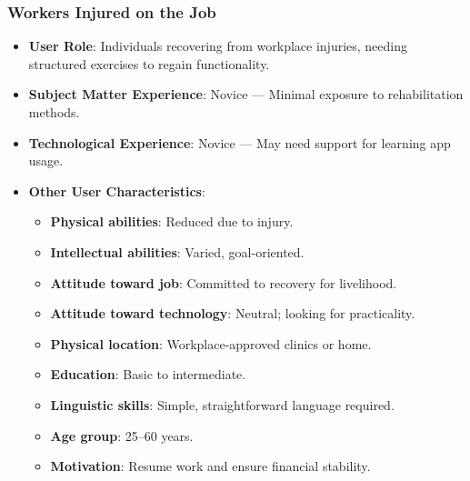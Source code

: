     \subsubsection{Workers Injured on the Job}
        \begin{itemize}
            \item \textbf{User Role}: Individuals recovering from workplace injuries, needing structured exercises to regain functionality.
            \item \textbf{Subject Matter Experience}: Novice --- Minimal exposure to rehabilitation methods.
            \item \textbf{Technological Experience}: Novice --- May need support for learning app usage.
            \item \textbf{Other User Characteristics}:
            \begin{itemize}
                \item \textbf{Physical abilities}: Reduced due to injury.
                \item \textbf{Intellectual abilities}: Varied, goal-oriented.
                \item \textbf{Attitude toward job}: Committed to recovery for livelihood.
                \item \textbf{Attitude toward technology}: Neutral; looking for practicality.
                \item \textbf{Physical location}: Workplace-approved clinics or home.
                \item \textbf{Education}: Basic to intermediate.
                \item \textbf{Linguistic skills}: Simple, straightforward language required.
                \item \textbf{Age group}: 25--60 years.
                \item \textbf{Motivation}: Resume work and ensure financial stability.
            \end{itemize}
        \end{itemize}

